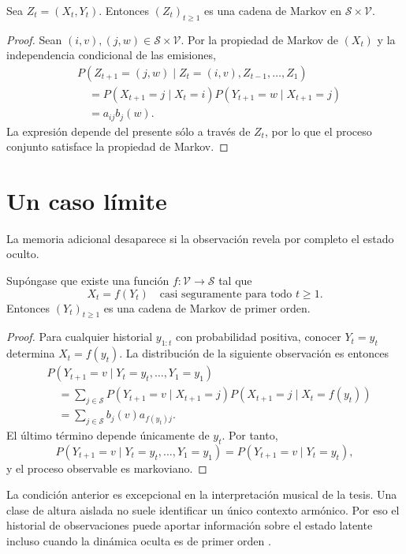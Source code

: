 \begin{proposition}
Sea $Z_t=(X_t,Y_t)$. Entonces $(Z_t)_{t\geq 1}$ es una cadena de Markov en $\mathcal{S}\times\mathcal{V}$.
\end{proposition}

\begin{proof}
Sean $(i,v),(j,w)\in\mathcal{S}\times\mathcal{V}$. Por la propiedad de Markov de $(X_t)$ y la independencia condicional de las emisiones,
\[
\begin{aligned}
&P(Z_{t+1}=(j,w)\mid Z_t=(i,v),Z_{t-1},\ldots,Z_1)\\
&\quad=
P(X_{t+1}=j\mid X_t=i)
P(Y_{t+1}=w\mid X_{t+1}=j)\\
&\quad=a_{ij}b_j(w).
\end{aligned}
\]
La expresión depende del presente sólo a través de $Z_t$, por lo que el proceso conjunto satisface la propiedad de Markov.
\end{proof}

\section{Un caso límite}

La memoria adicional desaparece si la observación revela por completo el estado oculto.

\begin{proposition}
Supóngase que existe una función $f:\mathcal{V}\to\mathcal{S}$ tal que
\[
X_t=f(Y_t)
\quad\text{casi seguramente para todo }t\geq 1.
\]
Entonces $(Y_t)_{t\geq 1}$ es una cadena de Markov de primer orden.
\end{proposition}

\begin{proof}
Para cualquier historial $y_{1:t}$ con probabilidad positiva, conocer $Y_t=y_t$ determina $X_t=f(y_t)$. La distribución de la siguiente observación es entonces
\[
\begin{aligned}
&P(Y_{t+1}=v\mid Y_t=y_t,\ldots,Y_1=y_1)\\
&\quad=
\sum_{j\in\mathcal{S}}
P(Y_{t+1}=v\mid X_{t+1}=j)
P(X_{t+1}=j\mid X_t=f(y_t))\\
&\quad=
\sum_{j\in\mathcal{S}}b_j(v)a_{f(y_t)j}.
\end{aligned}
\]
El último término depende únicamente de $y_t$. Por tanto,
\[
P(Y_{t+1}=v\mid Y_t=y_t,\ldots,Y_1=y_1)
=
P(Y_{t+1}=v\mid Y_t=y_t),
\]
y el proceso observable es markoviano.
\end{proof}

La condición anterior es excepcional en la interpretación musical de la tesis. Una clase de altura aislada no suele identificar un único contexto armónico. Por eso el historial de observaciones puede aportar información sobre el estado latente incluso cuando la dinámica oculta es de primer orden \cite{cappe2005}.
